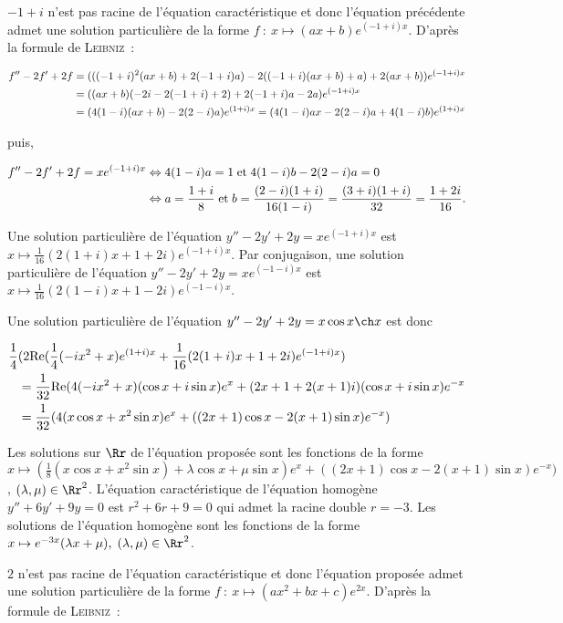 {{$-1+i$ n'est pas racine de l'équation caractéristique et donc
l'équation précédente admet une solution particulière de la forme $f~:~x\mapsto(ax+b)e^{(-1+i)x}$. D'après la formule
de \textsc{Leibniz}~:

\begin{align*}\ensuremath
f''-2f'+2f&=(((-1+i)^2(ax+b)+2(-1+i)a)-2((-1+i)(ax+b)+a)+2(ax+b))e^{(-1+i)x}\\
 &=((ax+b)(-2i-2(-1+i)+2)+2(-1+i)a-2a)e^{(-1+i)x}\\
 &=(4(1-i)(ax+b)-2(2-i)a)e^{(1+i)x}=(4(1-i)ax-2(2-i)a+4(1-i)b)e^{(1+i)x}
\end{align*}

puis,

\begin{align*}\ensuremath
f''-2f'+2f=xe^{(-1+i)x}&\Leftrightarrow4(1-i)a=1\;\mbox{et}\;4(1-i)b-2(2-i)a=0\\
 &\Leftrightarrow
a=\frac{1+i}{8}\;\mbox{et}\;b=\frac{(2-i)(1+i)}{16(1-i)}=\frac{(3+i)(1+i)}{32}=\frac{1+2i}{16}.
\end{align*}

Une solution particulière de l'équation $y''-2y'+2y=xe^{(-1+i)x}$ est $x\mapsto\frac{1}{16}(2(1+i)x+1+2i)e^{(-1+i)x}$.
Par conjugaison, une solution particulière de l'équation $y''-2y'+2y=xe^{(-1-i)x}$ est
$x\mapsto\frac{1}{16}(2(1-i)x+1-2i)e^{(-1-i)x}$.

Une solution particulière de l'équation $y''-2y'+2y=x\cos x\ch x$ est donc

\begin{align*}\ensuremath
\frac{1}{4}&(2\mbox{Re}(\frac{1}{4}(-ix^2+x)e^{(1+i)x}+\frac{1}{16}(2(1+i)x+1+2i)e^{(-1+i)x})\\
 &=\frac{1}{32}\mbox{Re}(4(-ix^2+x)(\cos x+i\sin x)e^x+(2x+1+2(x+1)i)(\cos x+i\sin x)e^{-x}\\
 &=\frac{1}{32}(4(x\cos x+x^2\sin x)e^x+((2x+1)\cos x-2(x+1)\sin x)e^{-x})
\end{align*}

Les solutions sur $\Rr$ de l'équation proposée sont les fonctions de la forme $x\mapsto(\frac{1}{8}(x\cos x+x^2\sin
x)+\lambda\cos x+\mu\sin x)e^x+((2x+1)\cos x-2(x+1)\sin x)e^{-x})$, $(\lambda,\mu)\in\Rr^2$.
L'équation caractéristique de l'équation homogène $y''+6y'+9y=0$ est $r^2+6r+9=0$ qui admet la racine double
$r=-3$. Les solutions de l'équation homogène sont les fonctions de la forme $x\mapsto
e^{-3x}(\lambda x+\mu),\;(\lambda,\mu)\in\Rr^2$.

$2$ n'est pas racine de l'équation caractéristique et donc
l'équation proposée admet une solution particulière de la forme $f~:~x\mapsto(ax^2+bx+c)e^{2x}$. D'après la formule
de \textsc{Leibniz}~:

}}
